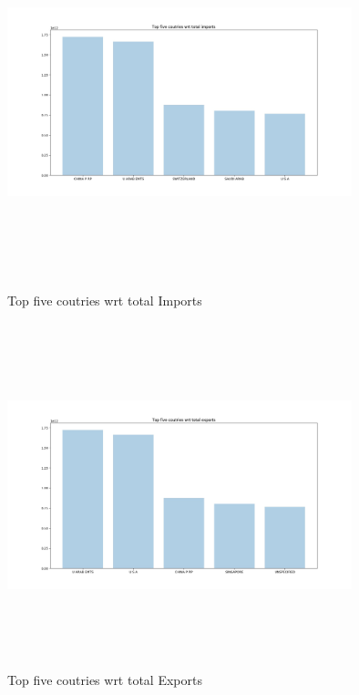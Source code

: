 \documentclass[12pt]{article}
\begin{document}
\begin{figure}[H]
	\includegraphics[height=10cm,width=10cm]{image_4.jpg}
	\caption{Top five coutries wrt total Imports}
	\label{Top five coutries wrt total Imports}
	\includegraphics[height=10cm,width=10cm]{image_5.jpg}
	\caption{Top five coutries wrt total Exports}
		\label{Top five coutries wrt total Exports}
\end{figure}
\pagebreak
\end{document}
